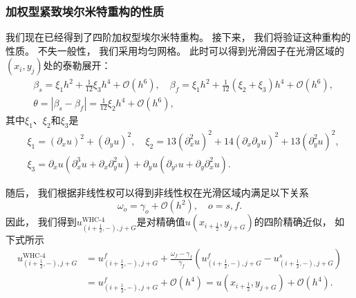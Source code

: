 \subsubsection{加权型紧致埃尔米特重构的性质}

我们现在已经得到了四阶加权型埃尔米特重构。
接下来，
我们将验证这种重构的性质。
不失一般性，
我们采用均匀网格。
此时可以得到光滑因子在光滑区域的$(x_i, y_j)$处的泰勒展开：
\begin{equation}
  \label{eq:Taylor}
  \begin{aligned}
     & \beta_{{s}}=\xi_1 h^2+\frac{1}{12}\xi_3 h^4+{\mathcal{O}}(h^6), \quad
    \beta_{{f}}=\xi_1 h^2 +\frac{1}{12}(\xi_2+\xi_3) h^4 +{\mathcal{O}}(h^6),        \\
     & \theta = |\beta_{{s}}-\beta_{{f}}|=\frac{1}{12}\xi_2 h^4+{\mathcal{O}}(h^6),
  \end{aligned}
\end{equation}
其中$\xi_1$、$\xi_2$和$\xi_3$是
\begin{equation}
  \begin{aligned}
     & \xi_1=\left({\partial_{x}}u\right)^2+\left({\partial_{y}}{u}\right)^2, \quad
    \xi_2=13\left({\partial_{x}^2}u\right)^2+14\left({\partial_{x}}{\partial_{y}}u\right)^2+13\left({\partial_{y}^2}u\right)^2,                                                 \\
     & \xi_3={\partial_{x}}u \left({\partial_{x}^3} u+{\partial_{x}}{\partial_{y}^2}u\right) +{\partial_{y}}u \left({\partial_{y^3}} u+{\partial_{y}}{\partial_{x}^2}u\right).
  \end{aligned}
\end{equation}

随后，
我们根据非线性权可以得到非线性权在光滑区域内满足以下关系
\begin{equation}
  \omega_{{o}}= \gamma_{{o}}+ {\mathcal{O}}(h^2) , \quad {{o}}={{s}}, {{f}}.
\end{equation}
因此，
我们得到$u_{(i+\frac{1}{2},-), j+G}^{\text{WHC-4}}$是对精确值$u(x_{i+\frac{1}{2}}, y_{j+G})$的四阶精确近似，
如下式所示
\begin{equation}
  \begin{aligned}
    u_{(i+\frac{1}{2},-), j+G}^{\text{WHC-4}}
     & = u_{(i+\frac{1}{2},-), j+G}^{{f}}+ \frac{\omega_{{f}}- \gamma_{{f}}}{\gamma_{{f}}}\left(u_{(i+\frac{1}{2},-), j+G}^{{f}}-u_{(i+\frac{1}{2},-), j+G}^{{s}}\right) \\
     & = u_{(i+\frac{1}{2},-), j+G}^{{f}}+ {\mathcal{O}}(h^4)= u(x_{i+\frac{1}{2}}, y_{j+G})+{\mathcal{O}}(h^4).
  \end{aligned}
\end{equation}

